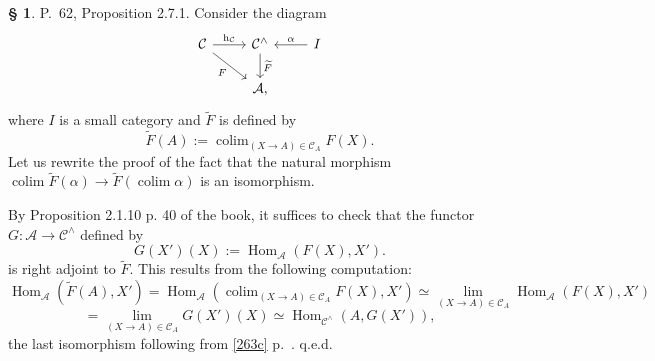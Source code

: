 \documentclass[12pt]{article}%
\theoremstyle{remark}
\theoremstyle{definition}
\newtheorem{s}[thm]{\S}%
\newcommand{\A}{\mathcal A}
\newcommand{\C}{\mathcal C}
\DeclareMathOperator*{\colim}{colim}
\DeclareMathOperator{\hy}{h}
\DeclareMathOperator{\Hom}{Hom}%
\begin{document}
\begin{s}\label{c271b}
P.~62, Proposition 2.7.1. Consider the diagram 
$$
\begin{tikzcd}
\C\ar{r}{\hy_\C}\ar{dr}[swap]{F}&\C^\wedge\ar{d}{\widetilde F}&I\ar{l}[swap]{\alpha}\\
&\A,
\end{tikzcd}
$$
where $I$ is a small category and $\widetilde F$ is defined by 
$$
\widetilde F(A):=\colim_{(X\to A)\in\C_A}F(X). 
$$
Let us rewrite the proof of the fact that the natural morphism $\colim\widetilde F(\alpha)\to\widetilde F\left(\colim\alpha\right)$ is an isomorphism. 

By Proposition 2.1.10 p. 40 of the book, it suffices to check that the functor $G:\A\to\C^\wedge$ defined by 
$$
G(X')(X):=\Hom_{\A}(F(X),X').
$$ 
is right adjoint to $\widetilde F$. This results from the following computation: 
$$
\Hom_{\A}\left(\widetilde F(A),X'\right)=
\Hom_{\A}\left(\colim_{(X\to A)\in\C_A}F(X),X'\right)\simeq 
\lim_{(X\to A)\in\C_A}\Hom_{\A}(F(X),X')
$$
$$
=\lim_{(X\to A)\in\C_A}G(X')(X)\simeq\Hom_{\C^\wedge}(A,G(X')), 
$$ 
the last isomorphism following from \eqref{263c} p.~\pageref{263c}. q.e.d.
\end{s}

%
\end{document}
